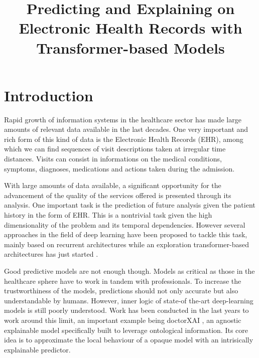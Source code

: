 \documentclass[]{marticle}
\title{\textbf{\huge Predicting and Explaining on Electronic Health Records with Transformer-based Models}}
\date{}
\begin{document}
\maketitle
\newpage

\tableofcontents
\newpage

\section{Introduction}

Rapid growth of information systems in the healthcare sector has made large amounts of relevant data
available in the last decades. One very important and rich form of this kind of data is the
Electronic Health Records (EHR), among which we can find sequences of visit descriptions taken at
irregular time distances. Visits can consist in informations on the medical conditions, symptoms,
diagnoses, medications and actions taken during the admission. 

With large amounts of data available, a significant opportunity for the advancement of the quality of
the services offered is presented through its analysis. One important task is the prediction of
future analysis given the patient history in the form of EHR. This is a nontrivial task given the
high dimensionality of the problem and its temporal dependencies. However several approaches in the
field of deep learning have been proposed to tackle this task, mainly based on recurrent
architectures  while an exploration transformer-based architectures has just started
.

Good predictive models are not enough though. Models as critical as those in the healthcare sphere
have to work in tandem with professionals. To increase the trustworthiness of the models,
predictions should not only accurate but also understandable by humans. However, inner logic of
state-of the-art deep-learning models is still poorly understood. Work has been conducted in the
last years to work around this limit, an important example being doctorXAI \cite{panigutti-xai}, an
agnostic explainable model specifically built to leverage ontological information. Its core idea is
to approximate the local behaviour of a opaque model with an intrisically explainable predictor.
\end{document}
